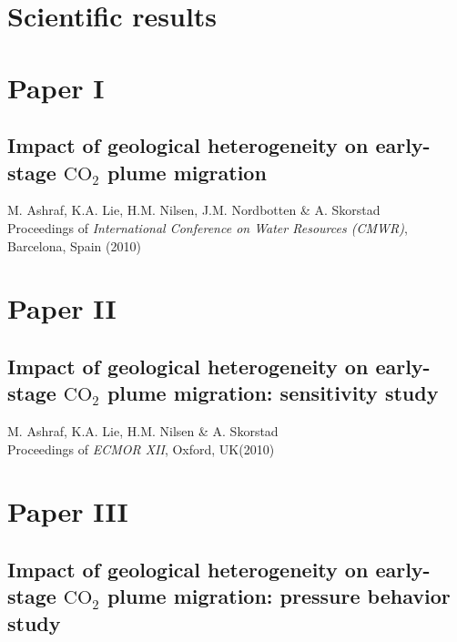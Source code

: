 \chapter{Scientific results}

\pagebreak
\chapter*{Paper I}
\section{Impact of geological heterogeneity on early-stage $\mbox{CO}_2$ plume
migration}

\noindent M. Ashraf, K.A. Lie, H.M. Nilsen, J.M. Nordbotten \& A. Skorstad\\

\noindent Proceedings of \textit{International Conference on Water
Resources (CMWR)}, Barcelona, Spain (2010)
\cleardoublepage



\chapter*{Paper II}
\section{Impact of geological heterogeneity on early-stage $\mbox{CO}_2$
plume migration: sensitivity study}

\noindent M. Ashraf, K.A. Lie, H.M. Nilsen \& A. Skorstad\\

\noindent Proceedings of \textit{ECMOR XII}, Oxford, UK(2010)
\cleardoublepage



\chapter*{Paper III}
\section{Impact of geological heterogeneity on early-stage $\mbox{CO}_2$ plume
migration: pressure behavior study}


